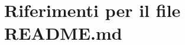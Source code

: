 \hypertarget{README_8md}{\section{Riferimenti per il file R\+E\+A\+D\+M\+E.\+md}
\label{README_8md}
}
